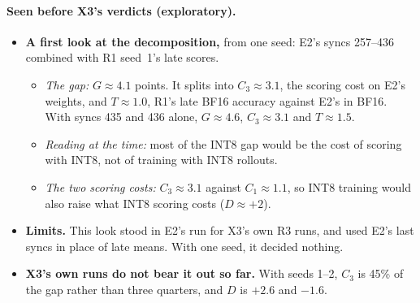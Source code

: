 \documentclass[11pt]{article}
\begin{document}
\paragraph{Seen before X3's verdicts (exploratory).}
\begin{itemize}
\item \textbf{A first look at the decomposition,} from one seed: E2's syncs 257--436 combined with R1 seed~1's late scores.
  \begin{itemize}
  \item \emph{The gap:} $G\approx4.1$ points. It splits into $C_3\approx3.1$, the scoring cost on E2's weights, and $T\approx1.0$, R1's late BF16 accuracy against E2's in BF16. With syncs 435 and 436 alone, $G\approx4.6$, $C_3\approx3.1$ and $T\approx1.5$.
  \item \emph{Reading at the time:} most of the INT8 gap would be the cost of scoring with INT8, not of training with INT8 rollouts.
  \item \emph{The two scoring costs:} $C_3\approx3.1$ against $C_1\approx1.1$, so INT8 training would also raise what INT8 scoring costs ($D\approx+2$).
  \end{itemize}
\item \textbf{Limits.} This look stood in E2's run for X3's own R3 runs, and used E2's last syncs in place of late means. With one seed, it decided nothing.
\item \textbf{X3's own runs do not bear it out so far.} With seeds 1--2, $C_3$ is 45\% of the gap rather than three quarters, and $D$ is $+2.6$ and $-1.6$.
\end{itemize}

\end{document}
